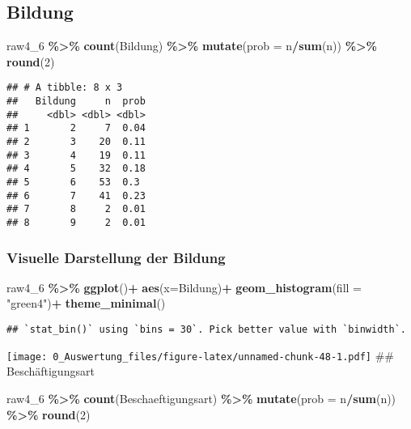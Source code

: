 \documentclass[
]{article}
\newenvironment{Shaded}{\begin{snugshade}}{\end{snugshade}}
\newcommand{\AttributeTok}[1]{\textcolor[rgb]{0.13,0.29,0.53}{#1}}
\newcommand{\DecValTok}[1]{\textcolor[rgb]{0.00,0.00,0.81}{#1}}
\newcommand{\FunctionTok}[1]{\textcolor[rgb]{0.13,0.29,0.53}{\textbf{#1}}}
\newcommand{\NormalTok}[1]{#1}
\newcommand{\SpecialCharTok}[1]{\textcolor[rgb]{0.81,0.36,0.00}{\textbf{#1}}}
\newcommand{\StringTok}[1]{\textcolor[rgb]{0.31,0.60,0.02}{#1}}
\begin{document}
\subsection{Bildung}\label{bildung}

\begin{Shaded}
\begin{Highlighting}[]
\NormalTok{raw4\_6 }\SpecialCharTok{\%\textgreater{}\%} 
  \FunctionTok{count}\NormalTok{(Bildung) }\SpecialCharTok{\%\textgreater{}\%} 
  \FunctionTok{mutate}\NormalTok{(}\AttributeTok{prob =}\NormalTok{ n}\SpecialCharTok{/}\FunctionTok{sum}\NormalTok{(n)) }\SpecialCharTok{\%\textgreater{}\%} 
  \FunctionTok{round}\NormalTok{(}\DecValTok{2}\NormalTok{)}
\end{Highlighting}
\end{Shaded}

\begin{verbatim}
## # A tibble: 8 x 3
##   Bildung     n  prob
##     <dbl> <dbl> <dbl>
## 1       2     7  0.04
## 2       3    20  0.11
## 3       4    19  0.11
## 4       5    32  0.18
## 5       6    53  0.3 
## 6       7    41  0.23
## 7       8     2  0.01
## 8       9     2  0.01
\end{verbatim}

\subsubsection{Visuelle Darstellung der
Bildung}\label{visuelle-darstellung-der-bildung}

\begin{Shaded}
\begin{Highlighting}[]
\NormalTok{raw4\_6 }\SpecialCharTok{\%\textgreater{}\%} 
  \FunctionTok{ggplot}\NormalTok{()}\SpecialCharTok{+}
  \FunctionTok{aes}\NormalTok{(}\AttributeTok{x=}\NormalTok{Bildung)}\SpecialCharTok{+}
  \FunctionTok{geom\_histogram}\NormalTok{(}\AttributeTok{fill =} \StringTok{"green4"}\NormalTok{)}\SpecialCharTok{+}
  \FunctionTok{theme\_minimal}\NormalTok{()}
\end{Highlighting}
\end{Shaded}

\begin{verbatim}
## `stat_bin()` using `bins = 30`. Pick better value with `binwidth`.
\end{verbatim}

\texttt{[image: 0\_Auswertung\_files/figure-latex/unnamed-chunk-48-1.pdf]}
\#\# Beschäftigungsart

\begin{Shaded}
\begin{Highlighting}[]
\NormalTok{raw4\_6 }\SpecialCharTok{\%\textgreater{}\%} 
  \FunctionTok{count}\NormalTok{(Beschaeftigungsart) }\SpecialCharTok{\%\textgreater{}\%} 
    \FunctionTok{mutate}\NormalTok{(}\AttributeTok{prob =}\NormalTok{ n}\SpecialCharTok{/}\FunctionTok{sum}\NormalTok{(n)) }\SpecialCharTok{\%\textgreater{}\%} 
  \FunctionTok{round}\NormalTok{(}\DecValTok{2}\NormalTok{)}
\end{Highlighting}
\end{Shaded}
\end{document}
